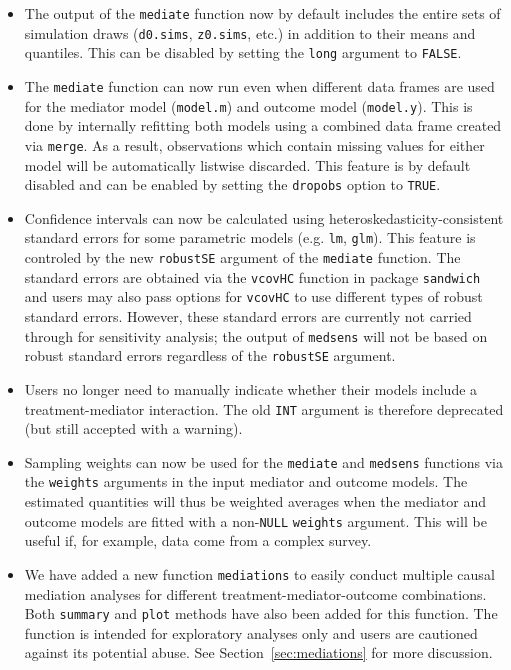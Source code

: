 \documentclass[11pt,letterpaper]{article}
\theoremstyle{plain}
\begin{document}
\begin{itemize}
\item The output of the {\tt mediate} function now by default includes the entire sets of
simulation draws ({\tt d0.sims}, {\tt z0.sims}, etc.) in addition to their means
and quantiles.  This can be disabled by setting the {\tt long} argument to {\tt FALSE}.

\item The {\tt mediate} function can now run even when different data frames are used
for the mediator model ({\tt model.m}) and outcome model ({\tt model.y}).  This is
done by internally refitting both models using a combined data frame created via {\tt merge}.
As a result, observations which contain missing values for either model will be
automatically listwise discarded.  This feature is by default disabled and can be
enabled by setting the {\tt dropobs} option to {\tt TRUE}.

\item Confidence intervals can now be calculated using heteroskedasticity-consistent
standard errors for some parametric models (e.g. {\tt lm}, {\tt glm}).  This
feature is controled by the new {\tt robustSE} argument of the {\tt mediate} function.
The standard errors are obtained via the {\tt vcovHC} function in package {\tt sandwich}
and users may also pass options for {\tt vcovHC} to use different types of
robust standard errors.  However, these standard errors are currently not carried
through for sensitivity analysis; the output of {\tt medsens} will not be based
on robust standard errors regardless of the {\tt robustSE} argument.

\item Users no longer need to manually indicate whether their models include a 
treatment-mediator interaction.  The old {\tt INT} argument is therefore deprecated 
(but still accepted with a warning).

\item Sampling weights can now be used for the {\tt mediate} and {\tt medsens}
functions via the {\tt weights} arguments in the input mediator and outcome models.
The estimated quantities will thus be weighted averages when the mediator and 
outcome models are fitted with a non-{\tt NULL} {\tt weights} argument. This 
will be useful if, for example, data come from a complex survey.

\item We have added a new function {\tt mediations} to easily conduct multiple
causal mediation analyses for different treatment-mediator-outcome combinations.
Both {\tt summary} and {\tt plot} methods have also been added for this function.
The function is intended for exploratory analyses only and users are cautioned against
its potential abuse.  See Section~\ref{sec:mediations} for more discussion.

\end{itemize}
\end{document}
